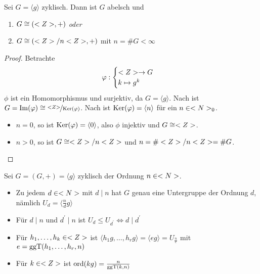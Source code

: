 \begin{proposition}
	Sei $G=\langle g\rangle$ zyklisch. Dann ist $G$ abelsch und
	\begin{enumerate}[label=(\alph*)]
		\item $G\cong (<Z>,+)$ \emph{oder}
		\item $G\cong (<Z>/n<Z>,+)$ mit $n=\#G<\infty$
	\end{enumerate}
\end{proposition}
\begin{proof}
	Betrachte 
	\begin{align}
		\varphi: \begin{cases}
		<Z>\to G\\ k\mapsto g^k
		\end{cases}\notag
	\end{align}
	$\phi$ ist ein Homomorphismus und surjektiv, da $G=\langle g\rangle$. Nach  ist $G=\operatorname{Im}(\varphi)\cong \nicefrac{<Z>}{\operatorname{Ker}(\varphi)}$. Nach  ist $\operatorname{Ker}(\varphi)=\langle n\rangle$ für ein $n\in<N>_0$.
	\begin{itemize}
		\item \emph{$n=0$}, so ist $\operatorname{Ker}(\varphi)=\langle 0\rangle$, also $\phi$ injektiv und $G\cong<Z>$.
		\item \emph{$n>0$}, so ist $G\cong<Z>/n<Z>$ und $n=\#<Z>/n<Z>=\#G$.
	\end{itemize}
\end{proof}

\begin{proposition}
	Sei $G=(G,+)=\langle g \rangle$ zyklisch der Ordnung $n \in <N>$.
	\begin{itemize}
		\item Zu jedem $d \in <N>$ mit $d\mid n$ hat $G$ genau eine Untergruppe der Ordnung $d$, nämlich $U_d=\langle \frac{n}{d}g\rangle$
		\item Für $d \mid n$ und $d^{'}\mid n$ ist $U_d \leq U_{d^{'}} \Leftrightarrow d \mid d^{'}$
		\item Für $h_1, \dots , h_k \in <Z>$ ist $\langle h_1 g, \dots, h_r g \rangle = \langle eg\rangle = U_{\frac{n}{e}}$ mit $e = \operatorname{ggT}(h_1,\dots,h_r,n)$
		\item Für $k \in <Z>$ ist $\operatorname{ord}(kg)= \frac{n}{\operatorname{ggT}(k,n)}$
	\end{itemize}
\end{proposition}

